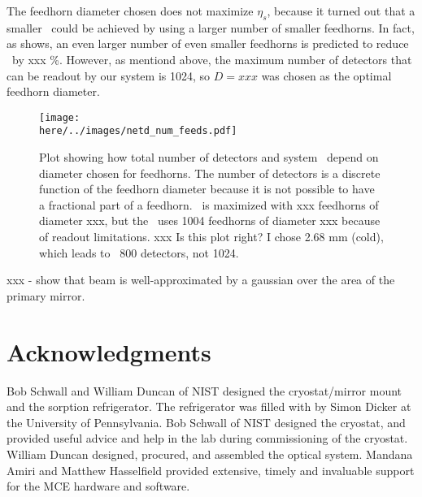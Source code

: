 The feedhorn diameter chosen does not maximize $\eta_s$, because it turned out that a smaller \NETD\ could be achieved by using a larger number of smaller feedhorns.
In fact, as  shows, an even larger number of even smaller feedhorns is predicted to reduce \NETD\ by xxx \%.
However, as mentiond above, the maximum number of detectors that can be readout by our system is 1024, so $D = xxx$ was chosen as the optimal feedhorn diameter.

\begin{figure*}[th]
\centering
\texttt{[image: \\here/../images/netd\_num\_feeds.pdf]}
\caption{Plot showing how total number of detectors and system \NETD\ depend on diameter chosen for feedhorns. The number of detectors is a discrete function of the feedhorn diameter because it is not possible to have a fractional part of a feedhorn. \NETD\ is maximized with xxx feedhorns of diameter xxx, but the \Imager\ uses 1004 feedhorns of diameter xxx because of readout limitations. xxx Is this plot right? I chose 2.68 mm (cold), which leads to ~800 detectors, not 1024.}
\label{fig:netd-num-feeds}
\end{figure*}

xxx - show that beam is well-approximated by a gaussian over the area of the primary mirror.

%


\section{Acknowledgments}

Bob Schwall and William Duncan of NIST designed the cryostat/mirror mount and the  sorption refrigerator.
The refrigerator was filled with  by Simon Dicker at the University of Pennsylvania.
Bob Schwall of NIST designed the cryostat, and provided useful advice and help in the lab during commissioning of the cryostat.
William Duncan designed, procured, and assembled the optical system.
Mandana Amiri and Matthew Hasselfield provided extensive, timely and invaluable support for the MCE hardware and software.
